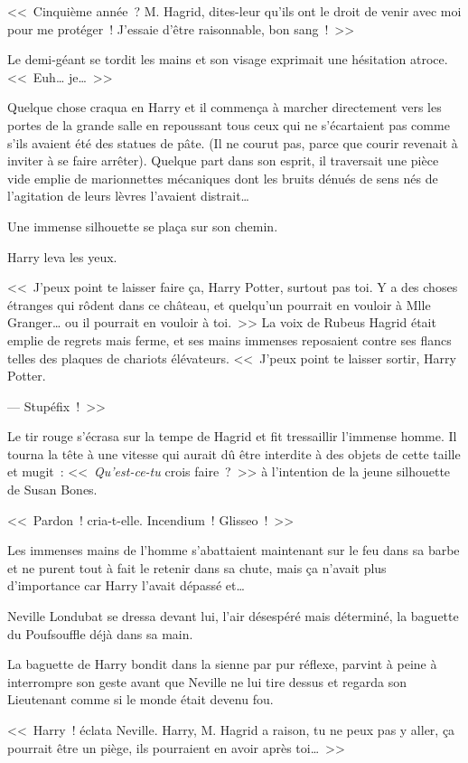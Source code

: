 <<~Cinquième année~? M. Hagrid, dites-leur qu'ils ont le droit de venir avec moi pour me protéger~! J'essaie d'être raisonnable, bon sang~!~>>

Le demi-géant se tordit les mains et son visage exprimait une hésitation atroce. <<~Euh… je…~>>

Quelque chose craqua en Harry et il commença à marcher directement vers les portes de la grande salle en repoussant tous ceux qui ne s'écartaient pas comme s'ils avaient été des statues de pâte. (Il ne courut pas, parce que courir revenait à inviter à se faire arrêter). Quelque part dans son esprit, il traversait une pièce vide emplie de marionnettes mécaniques dont les bruits dénués de sens nés de l'agitation de leurs lèvres l'avaient distrait…

Une immense silhouette se plaça sur son chemin.

Harry leva les yeux.

<<~J'peux point te laisser faire ça, Harry Potter, surtout pas toi. Y a des choses étranges qui rôdent dans ce château, et quelqu'un pourrait en vouloir à Mlle Granger… ou il pourrait en vouloir à toi.~>> La voix de Rubeus Hagrid était emplie de regrets mais ferme, et ses mains immenses reposaient contre ses flancs telles des plaques de chariots élévateurs. <<~J'peux point te laisser sortir, Harry Potter.

--- Stupéfix~!~>>

Le tir rouge s'écrasa sur la tempe de Hagrid et fit tressaillir l'immense homme. Il tourna la tête à une vitesse qui aurait dû être interdite à des objets de cette taille et mugit~: <<~\emph{Qu'est-ce-tu} crois faire~?~>> à l'intention de la jeune silhouette de Susan Bones.

<<~Pardon~! cria-t-elle. Incendium~! Glisseo~!~>>

Les immenses mains de l'homme s'abattaient maintenant sur le feu dans sa barbe et ne purent tout à fait le retenir dans sa chute, mais ça n'avait plus d'importance car Harry l'avait dépassé et…

Neville Londubat se dressa devant lui, l'air désespéré mais déterminé, la baguette du Poufsouffle déjà dans sa main.

La baguette de Harry bondit dans la sienne par pur réflexe, parvint à peine à interrompre son geste avant que Neville ne lui tire dessus et regarda son Lieutenant comme si le monde était devenu fou.

<<~Harry~! éclata Neville. Harry, M. Hagrid a raison, tu ne peux pas y aller, ça pourrait être un piège, ils pourraient en avoir après toi…~>>

